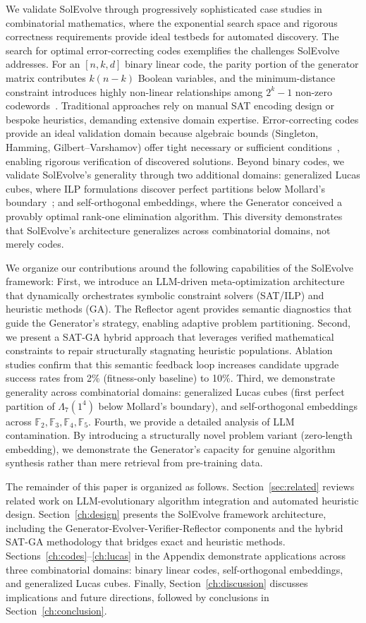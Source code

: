 We validate SolEvolve through progressively sophisticated case studies in combinatorial mathematics, where the exponential search space and rigorous correctness requirements provide ideal testbeds for automated discovery. The search for optimal error-correcting codes exemplifies the challenges SolEvolve addresses. For an $[n,k,d]$ binary linear code, the parity portion of the generator matrix contributes $k(n-k)$ Boolean variables, and the minimum-distance constraint introduces highly non-linear relationships among $2^{k}-1$ non-zero codewords~\cite{Huffman}. Traditional approaches rely on manual SAT encoding design or bespoke heuristics, demanding extensive domain expertise. Error-correcting codes provide an ideal validation domain because algebraic bounds (Singleton, Hamming, Gilbert--Varshamov) offer tight necessary or sufficient conditions~\cite{Huffman,Kim:2023}, enabling rigorous verification of discovered solutions. Beyond binary codes, we validate SolEvolve's generality through two additional domains: generalized Lucas cubes, where ILP formulations discover perfect partitions below Mollard's boundary~\cite{Mollard2022}; and self-orthogonal embeddings, where the Generator conceived a provably optimal rank-one elimination algorithm. This diversity demonstrates that SolEvolve's architecture generalizes across combinatorial domains, not merely codes.

We organize our contributions around the following capabilities of the SolEvolve framework:
First, we introduce an LLM-driven meta-optimization architecture that dynamically orchestrates symbolic constraint solvers (SAT/ILP) and heuristic methods (GA). The Reflector agent provides semantic diagnostics that guide the Generator's strategy, enabling adaptive problem partitioning.
Second, we present a SAT-GA hybrid approach that leverages verified mathematical constraints to repair structurally stagnating heuristic populations. Ablation studies confirm that this semantic feedback loop increases candidate upgrade success rates from 2\% (fitness-only baseline) to 10\%.
Third, we demonstrate generality across combinatorial domains: generalized Lucas cubes (first perfect partition of $\Lambda_7(1^4)$ below Mollard's boundary), and self-orthogonal embeddings across $\mathbb{F}_2, \mathbb{F}_3, \mathbb{F}_4, \mathbb{F}_5$.
Fourth, we provide a detailed analysis of LLM contamination. By introducing a structurally novel problem variant (zero-length embedding), we demonstrate the Generator's capacity for genuine algorithm synthesis rather than mere retrieval from pre-training data.

The remainder of this paper is organized as follows. Section~\ref{sec:related} reviews related work on LLM-evolutionary algorithm integration and automated heuristic design. Section~\ref{ch:design} presents the SolEvolve framework architecture, including the Generator-Evolver-Verifier-Reflector components and the hybrid SAT-GA methodology that bridges exact and heuristic methods. Sections~\ref{ch:codes}--\ref{ch:lucas} in the Appendix demonstrate applications across three combinatorial domains: binary linear codes, self-orthogonal embeddings, and generalized Lucas cubes. Finally, Section~\ref{ch:discussion} discusses implications and future directions, followed by conclusions in Section~\ref{ch:conclusion}.
